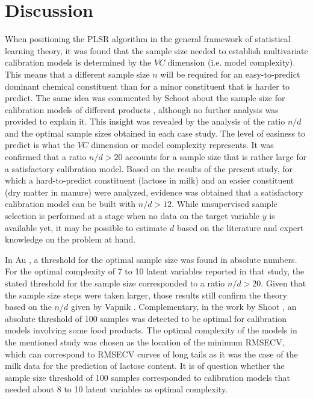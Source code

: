 \documentclass[preprint,12pt]{elsarticle}
\begin{document}



\section{Discussion}\label{discussion}

When positioning the PLSR algorithm in the general framework of statistical learning theory, it was found that the sample size needed to establish multivariate calibration models is determined by the $VC$ dimension (i.e. model complexity). This means that a different sample size $n$ will be required for an easy-to-predict dominant chemical constituent than for a minor constituent that is harder to predict. The same idea was commented by Schoot about the sample size for calibration models of different products \cite{Schoot2020}, although no further analysis was provided to explain it. This insight was revealed by the analysis of the ratio $n/d$ and the optimal sample sizes obtained in each case study. The level of easiness to predict is what the $VC$ dimension or model complexity represents. It was confirmed that a ratio $n/d>20$ accounts for a sample size that is rather large for a satisfactory calibration model. Based on the results of the present study, for which a hard-to-predict constituent (lactose in milk) and an easier constituent (dry matter in manure) were analyzed, evidence was obtained that a satisfactory calibration model can be built with $n/d>12$. While unsupervised sample selection is performed at a stage when no data on the target variable $y$ is available yet, it may be possible to estimate $d$ based on the literature and expert knowledge on the problem at hand.

In Au \cite{Au2020}, a threshold for the optimal sample size was found in absolute numbers. For the optimal complexity of 7 to 10 latent variables reported in that study, the stated threshold for the sample size corresponded to a ratio $n/d > 20$. Given that the sample size steps were taken larger, those results still confirm the theory based on the $n/d$ given by Vapnik \cite{Vapnik2000}. Complementary, in the work by Shoot  \cite{Schoot2020}, an absolute threshold of 100 samples was detected to be optimal for calibration models involving some food products. The optimal complexity of the models in the mentioned study was chosen as the location of the minimum RMSECV, which can correspond to RMSECV curves of long tails as it was the case of the milk data for the prediction of lactose content. It is of question whether the sample size threshold of 100 samples corresponded to calibration models that needed about 8 to 10 latent variables as optimal complexity.  
\end{document}
